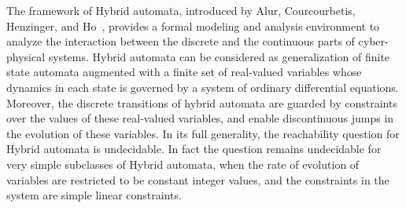 The framework of Hybrid automata, introduced by Alur, Courcourbetis, Henzinger, and Ho~\cite{ACH92}, provides a formal modeling and analysis environment to analyze the interaction between the discrete and the continuous parts of cyber-physical systems. Hybrid automata can be considered as generalization of finite state automata augmented with a finite set of real-valued variables whose dynamics in each state is governed by a system of ordinary differential equations. Moreover, the discrete transitions of hybrid automata are guarded by constraints over the values of these real-valued variables, and enable discontinuous jumps in the evolution of these variables. 
In its full generality, the reachability question for Hybrid automata is undecidable. In fact the question remains undecidable for very simple subclasses of Hybrid automata, when the rate of evolution of variables are restricted to be constant integer values, and the constraints in the system are simple linear constraints.
